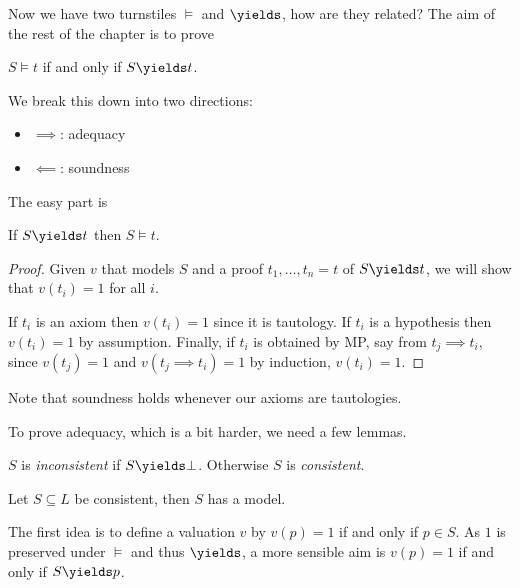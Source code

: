 \documentclass[a4paper]{article}
\begin{document}
Now we have two turnstiles \(\models\) and \(\yields\), how are they related? The aim of the rest of the chapter is to prove

\begin{theorem}
  \(S \models t\) if and only if \(S \yields t\).
\end{theorem}

We break this down into two directions:
\begin{itemize}
\item \(\implies\): adequacy
\item \(\impliedby\): soundness
\end{itemize}

The easy part is

\begin{proposition}[Soundness]
  If \(S \yields t\) then \(S \models t\).
\end{proposition}

\begin{proof}
  Given \(v\) that models \(S\) and a proof \(t_1, \dots, t_n = t\) of \(S \yields t\), we will show that \(v(t_i) = 1\) for all \(i\).

  If \(t_i\) is an axiom then \(v(t_i) = 1\) since it is tautology. If \(t_i\) is a hypothesis then \(v(t_i) = 1\) by assumption. Finally, if \(t_i\) is obtained by MP, say from \(t_j \implies t_i\), since \(v(t_j) = 1\) and \(v(t_j \implies t_i) = 1\) by induction, \(v(t_i) = 1\).
\end{proof}

Note that soundness holds whenever our axioms are tautologies.

To prove adequacy, which is a bit harder, we need a few lemmas.

\begin{definition}[Consistency]
  \(S\) is \emph{inconsistent} if \(S \yields \bot\). Otherwise \(S\) is \emph{consistent}.
\end{definition}

\begin{theorem}
  Let \(S \subseteq L\) be consistent, then \(S\) has a model.
\end{theorem}

The first idea is to define a valuation \(v\) by \(v(p) = 1\) if and only if \(p \in S\). As \(1\) is preserved under \(\models\) and thus \(\yields\), a more sensible aim is \(v(p) = 1\) if and only if \(S \yields p\).
\end{document}
